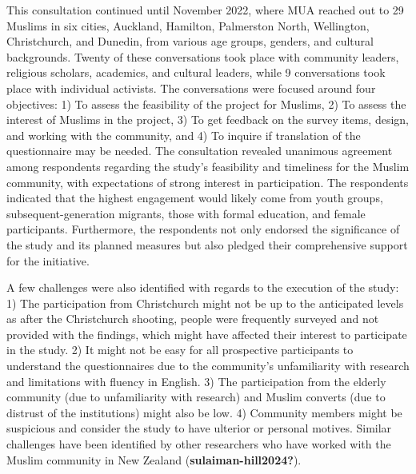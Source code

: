 \documentclass[
]{interact}
\begin{document}
This consultation continued until November 2022, where MUA reached out
to 29 Muslims in six cities, Auckland, Hamilton, Palmerston North,
Wellington, Christchurch, and Dunedin, from various age groups, genders,
and cultural backgrounds. Twenty of these conversations took place with
community leaders, religious scholars, academics, and cultural leaders,
while 9 conversations took place with individual activists. The
conversations were focused around four objectives: 1) To assess the
feasibility of the project for Muslims, 2) To assess the interest of
Muslims in the project, 3) To get feedback on the survey items, design,
and working with the community, and 4) To inquire if translation of the
questionnaire may be needed. The consultation revealed unanimous
agreement among respondents regarding the study's feasibility and
timeliness for the Muslim community, with expectations of strong
interest in participation. The respondents indicated that the highest
engagement would likely come from youth groups, subsequent-generation
migrants, those with formal education, and female participants.
Furthermore, the respondents not only endorsed the significance of the
study and its planned measures but also pledged their comprehensive
support for the initiative.

A few challenges were also identified with regards to the execution of
the study: 1) The participation from Christchurch might not be up to the
anticipated levels as after the Christchurch shooting, people were
frequently surveyed and not provided with the findings, which might have
affected their interest to participate in the study. 2) It might not be
easy for all prospective participants to understand the questionnaires
due to the community's unfamiliarity with research and limitations with
fluency in English. 3) The participation from the elderly community (due
to unfamiliarity with research) and Muslim converts (due to distrust of
the institutions) might also be low. 4) Community members might be
suspicious and consider the study to have ulterior or personal motives.
Similar challenges have been identified by other researchers who have
worked with the Muslim community in New Zealand
(\textbf{sulaiman-hill2024?}).
\end{document}
